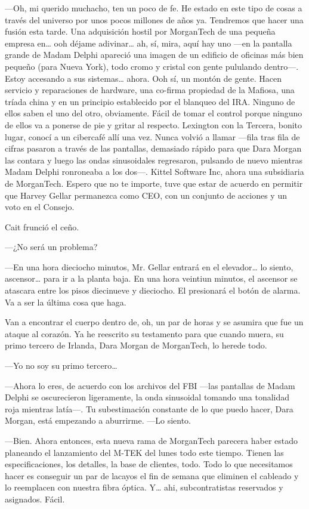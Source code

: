 ---Oh, mi querido muchacho, ten un poco de fe. He estado en este tipo de
cosas a través del universo por unos pocos millones de años ya.
Tendremos que hacer una fusión esta tarde. Una adquisición hostil por
MorganTech de una pequeña empresa en\ldots{} ooh déjame adivinar\ldots{}
ah, sí, mira, aquí hay uno ---en la pantalla grande de Madam Delphi
apareció una imagen de un edificio de oficinas más bien pequeño (para
Nueva York), todo cromo y cristal con gente pululando dentro---. Estoy
accesando a sus sistemas\ldots{} ahora. Ooh sí, un montón de gente.
Hacen servicio y reparaciones de hardware, una co-firma propiedad de la
Mafiosa, una tríada china y en un principio establecido por el blanqueo
del IRA. Ninguno de ellos saben el uno del otro, obviamente. Fácil de
tomar el control porque ninguno de ellos va a ponerse de pie y gritar al
respecto. Lexington con la Tercera, bonito lugar, conocí a un cibercafé
allí una vez. Nunca volvió a llamar ---fila tras fila de cifras pasaron
a través de las pantallas, demasiado rápido para que Dara Morgan las
contara y luego las ondas sinusoidales regresaron, pulsando de nuevo
mientras Madam Delphi ronroneaba a los dos---. Kittel Software Inc,
ahora una subsidiaria de MorganTech. Espero que no te importe, tuve que
estar de acuerdo en permitir que Harvey Gellar permanezca como CEO, con
un conjunto de acciones y un voto en el Consejo.

Cait frunció el ceño.

---¿No será un problema?

---En una hora dieciocho minutos, Mr. Gellar entrará en el
elevador\ldots{} lo siento, ascensor\ldots{} para ir a la planta baja.
En una hora veintiun minutos, el ascensor se atascara entre los pisos
diecinueve y dieciocho. El presionará el botón de alarma. Va a ser la
última cosa que haga.

Van a encontrar el cuerpo dentro de, oh, un par de horas y se asumira
que fue un ataque al corazón. Ya he reescrito su testamento para que
cuando muera, su primo tercero de Irlanda, Dara Morgan de MorganTech, lo
herede todo.

---Yo no soy su primo tercero\ldots{}

---Ahora lo eres, de acuerdo con los archivos del FBI ---las pantallas
de Madam Delphi se oscurecieron ligeramente, la onda sinusoidal tomando
una tonalidad roja mientras latía---. Tu subestimación constante de lo
que puedo hacer, Dara Morgan, está empezando a aburrirme. ---Lo siento.

---Bien. Ahora entonces, esta nueva rama de MorganTech parecera haber
estado planeando el lanzamiento del M-TEK del lunes todo este tiempo.
Tienen las especificaciones, los detalles, la base de clientes, todo.
Todo lo que necesitamos hacer es conseguir un par de lacayos el fin de
semana que eliminen el cableado y lo reemplacen con nuestra fibra
óptica. Y\ldots{} ahi, subcontratistas reservados y asignados. Fácil.

